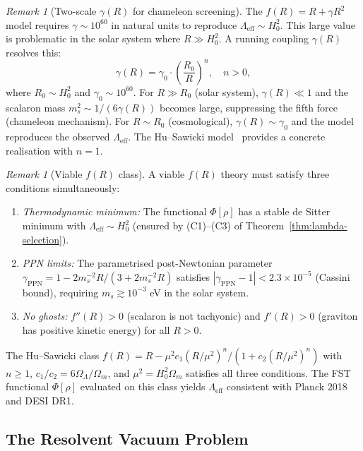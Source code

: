 \documentclass[12pt,a4paper]{article}
\theoremstyle{definition}
\theoremstyle{plain}
\theoremstyle{remark}
\newtheorem{remark}[definition]{Remark}
\begin{document}
\begin{remark}[Two-scale $\gamma(R)$ for chameleon screening]
\label{rem:two-scale-gamma}
The $f(R) = R + \gamma R^2$ model requires $\gamma \sim 10^{60}$ in natural units to reproduce $\Lambda_{\mathrm{eff}} \sim H_0^2$. This large value is problematic in the solar system where $R \gg H_0^2$. A running coupling $\gamma(R)$ resolves this:
\[
\gamma(R) = \gamma_0 \cdot \left(\frac{R_0}{R}\right)^n, \quad n > 0,
\]
where $R_0 \sim H_0^2$ and $\gamma_0 \sim 10^{60}$. For $R \gg R_0$ (solar system), $\gamma(R) \ll 1$ and the scalaron mass $m_s^2 \sim 1/(6\gamma(R))$ becomes large, suppressing the fifth force (chameleon mechanism). For $R \sim R_0$ (cosmological), $\gamma(R) \sim \gamma_0$ and the model reproduces the observed $\Lambda_{\mathrm{eff}}$. The Hu--Sawicki model~\cite{HuSawicki2007} provides a concrete realisation with $n = 1$.
\end{remark}

\begin{remark}[Viable $f(R)$ class]
\label{rem:viable-fR}
A viable $f(R)$ theory must satisfy three conditions simultaneously:
\begin{enumerate}
\item \emph{Thermodynamic minimum:} The functional $\Phi[\rho]$ has a stable de Sitter minimum with $\Lambda_{\mathrm{eff}} \sim H_0^2$ (ensured by (C1)--(C3) of Theorem~\ref{thm:lambda-selection}).
\item \emph{PPN limits:} The parametrised post-Newtonian parameter $\gamma_{\mathrm{PPN}} = 1 - 2m_s^{-2} R / (3 + 2m_s^{-2} R)$ satisfies $|\gamma_{\mathrm{PPN}} - 1| < 2.3 \times 10^{-5}$ (Cassini bound), requiring $m_s \gtrsim 10^{-3}$ eV in the solar system.
\item \emph{No ghosts:} $f''(R) > 0$ (scalaron is not tachyonic) and $f'(R) > 0$ (graviton has positive kinetic energy) for all $R > 0$.
\end{enumerate}
The Hu--Sawicki class $f(R) = R - \mu^2 c_1 (R/\mu^2)^n / (1 + c_2 (R/\mu^2)^n)$ with $n \geq 1$, $c_1/c_2 = 6\Omega_\Lambda/\Omega_m$, and $\mu^2 = H_0^2 \Omega_m$ satisfies all three conditions. The FST functional $\Phi[\rho]$ evaluated on this class yields $\Lambda_{\mathrm{eff}}$ consistent with Planck 2018 and DESI DR1.
\end{remark}

\subsection{The Resolvent Vacuum Problem}\label{sec:resolvent-vacuum}
\end{document}
